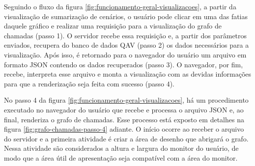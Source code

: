 Seguindo o fluxo da figura \ref{fig:funcionamento-geral-visualizacoes}, a partir da visualização de sumarização de cenários, o usuário pode clicar em uma das fatias daquele gráfico e realizar uma requisição para a visualização do grafo de chamadas (passo 1). O servidor recebe essa requisição e, a partir dos parâmetros enviados, recupera do banco de dados QAV (passo 2) os dados necessários para a visualização. Após isso, é retornado para o navegador do usuário um arquivo em formato JSON contendo os dados recuperados (passo 3). O navegador, por fim, recebe, interpreta esse arquivo e monta a visualização com as devidas informações para que a renderização seja feita com sucesso (passo 4).

No passo 4 da figura \ref{fig:funcionamento-geral-visualizacoes}, há um procedimento executado no navegador do usuário que recebe e processa o arquivo JSON e, ao final, renderiza o grafo de chamadas. Esse processo está exposto em detalhes na figura \ref{fig:grafo-chamadas-passo-4} adiante. O início ocorre ao receber o arquivo do servidor e a primeira atividade é criar a área de desenho que abrigará o grafo. Nessa atividade são considerados a altura e largura do monitor do usuário, de modo que a área útil de apresentação seja compatível com a área do monitor.

